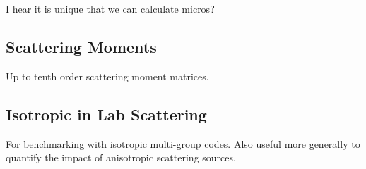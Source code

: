 I hear it is unique that we can calculate micros?


\subsection{Scattering Moments}
\label{subsec:scatt-moments}

Up to tenth order scattering moment matrices.


\subsection{Isotropic in Lab Scattering}
\label{subsec:iso-in-lab}

For benchmarking with isotropic multi-group codes. Also useful more generally to quantify the impact of anisotropic scattering sources.
